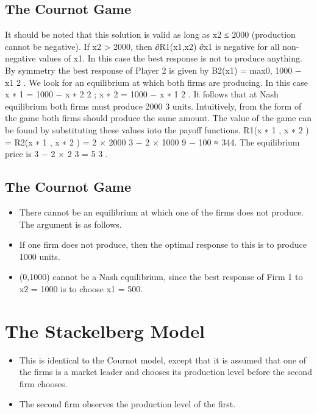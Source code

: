 \documentclass[]{report}
\begin{document}
\subsection{The Cournot Game}
It should be noted that this solution is valid as long as x2 ≤ 2000
(production cannot be negative).
If x2 > 2000, then ∂R1(x1,x2)
∂x1
is negative for all non-negative values
of x1.
In this case the best response is not to produce anything.
By symmetry the best response of Player 2 is given by
B2(x1) = max{0, 1000 −
x1
2
}.
We look for an equilibrium at which both firms are producing. In
this case
x
∗
1 = 1000 −
x
∗
2
2
; x
∗
2 = 1000 −
x
∗
1
2
.
It follows that at Nash equilibrium both firms must produce 2000
3
units.
Intuitively, from the form of the game both firms should produce
the same amount.
The value of the game can be found by substituting these values
into the payoff functions.
R1(x
∗
1
, x
∗
2
) = R2(x
∗
1
, x
∗
2
) = 2 ×
2000
3
− 2 ×
1000
9
− 100 ≈ 344.
The equilibrium price is 3 − 2 ×
2
3 =
5
3
.
\subsection{The Cournot Game}
\begin{itemize}
	\item There cannot be an equilibrium at which one of the firms does not
	produce. The argument is as follows.
	\item If one firm does not produce, then the optimal response to this is
	to produce 1000 units.
	\item (0,1000) cannot be a Nash equilibrium, since the best response of
	Firm 1 to x2 = 1000 is to choose x1 = 500.
\end{itemize}

\section{The Stackelberg Model}
\begin{itemize}
	\item This is identical to the Cournot model, except that it is assumed
	that one of the firms is a market leader and chooses its production
	level before the second firm chooses.
	\item	The second firm observes the production level of the first.
\end{itemize}
\end{document}
